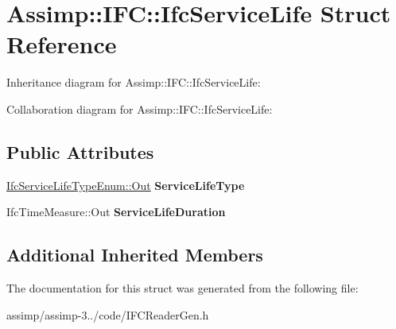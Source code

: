 \hypertarget{struct_assimp_1_1_i_f_c_1_1_ifc_service_life}{\section{Assimp\+:\+:I\+F\+C\+:\+:Ifc\+Service\+Life Struct Reference}
\label{struct_assimp_1_1_i_f_c_1_1_ifc_service_life}
}


Inheritance diagram for Assimp\+:\+:I\+F\+C\+:\+:Ifc\+Service\+Life\+:


Collaboration diagram for Assimp\+:\+:I\+F\+C\+:\+:Ifc\+Service\+Life\+:
\subsection*{Public Attributes}
\begin{DoxyCompactItemize}
\item 
\hypertarget{struct_assimp_1_1_i_f_c_1_1_ifc_service_life_a5f30d12982d522f68182e2ad681c6c37}{\hyperlink{classboost_1_1shared__ptr}{Ifc\+Service\+Life\+Type\+Enum\+::\+Out} {\bfseries Service\+Life\+Type}}\label{struct_assimp_1_1_i_f_c_1_1_ifc_service_life_a5f30d12982d522f68182e2ad681c6c37}

\item 
\hypertarget{struct_assimp_1_1_i_f_c_1_1_ifc_service_life_aed25f2d3de8f8723b67e0af86bb35259}{Ifc\+Time\+Measure\+::\+Out {\bfseries Service\+Life\+Duration}}\label{struct_assimp_1_1_i_f_c_1_1_ifc_service_life_aed25f2d3de8f8723b67e0af86bb35259}

\end{DoxyCompactItemize}
\subsection*{Additional Inherited Members}


The documentation for this struct was generated from the following file\+:\begin{DoxyCompactItemize}
\item 
assimp/assimp-\/3../code/I\+F\+C\+Reader\+Gen.\+h\end{DoxyCompactItemize}
